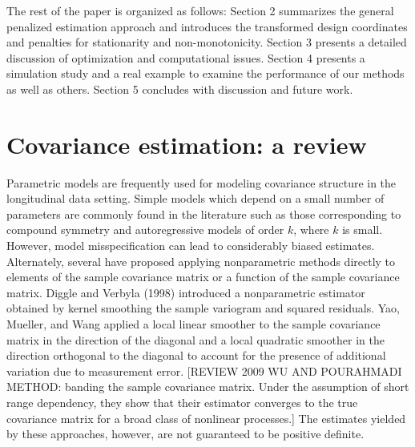 \documentclass[12pt]{article}
\newcommand*\needsparaphrased{\color{red}}
\begin{document}
The rest of the paper is organized as follows: Section 2 summarizes the general penalized estimation approach and introduces the transformed design coordinates and penalties for stationarity and non-monotonicity. Section 3 presents a detailed discussion of optimization and computational issues. Section 4 presents a simulation study and a real example to examine the performance of our methods as well as others. Section 5 concludes with discussion and future work.	

\section{Covariance estimation: a review}

Parametric models are frequently used for modeling covariance structure in the longitudinal data setting. Simple models which depend on a small number of parameters  are commonly found in the literature such as those corresponding to compound symmetry and autoregressive models of order $k$, where $k$ is small. However, model misspecification can lead to considerably biased estimates. Alternately, several have proposed applying nonparametric methods directly to elements of the sample covariance matrix or a function of the sample covariance matrix. Diggle and Verbyla (1998) introduced a nonparametric estimator obtained by kernel smoothing the sample variogram and squared residuals.  Yao, Mueller, and Wang applied a local linear smoother to the sample covariance matrix in the direction of the diagonal and a local quadratic smoother in the direction orthogonal to the diagonal to account for the presence of additional variation due to measurement error.  {\needsparaphrased[REVIEW 2009 WU AND POURAHMADI  METHOD: banding the sample covariance matrix. Under the assumption of short range dependency, they show that their estimator converges to the true covariance matrix for a broad class of nonlinear processes.]} The estimates yielded by these approaches, however, are not guaranteed to be positive definite. 
\end{document}
